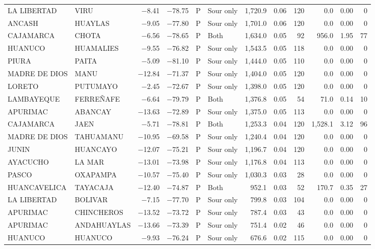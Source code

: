 \begin{landscape}
\begin{longtable}{llrrclrrrrrr}
LA LIBERTAD & VIRU & $-$8.41 & $-$78.75 & P & Sour only & 1,720.9 & 0.06 & 120 & 0.0 & 0.00 & 0 \\
ANCASH & HUAYLAS & $-$9.05 & $-$77.80 & P & Sour only & 1,701.0 & 0.06 & 120 & 0.0 & 0.00 & 0 \\
CAJAMARCA & CHOTA & $-$6.56 & $-$78.65 & P & Both & 1,634.0 & 0.05 & 92 & 956.0 & 1.95 & 77 \\
HUANUCO & HUAMALIES & $-$9.55 & $-$76.82 & P & Sour only & 1,543.5 & 0.05 & 118 & 0.0 & 0.00 & 0 \\
PIURA & PAITA & $-$5.09 & $-$81.10 & P & Sour only & 1,444.0 & 0.05 & 110 & 0.0 & 0.00 & 0 \\
MADRE DE DIOS & MANU & $-$12.84 & $-$71.37 & P & Sour only & 1,404.0 & 0.05 & 120 & 0.0 & 0.00 & 0 \\
LORETO & PUTUMAYO & $-$2.45 & $-$72.67 & P & Sour only & 1,398.0 & 0.05 & 120 & 0.0 & 0.00 & 0 \\
LAMBAYEQUE & FERREÑAFE & $-$6.64 & $-$79.79 & P & Both & 1,376.8 & 0.05 & 54 & 71.0 & 0.14 & 10 \\
APURIMAC & ABANCAY & $-$13.63 & $-$72.89 & P & Sour only & 1,375.0 & 0.05 & 113 & 0.0 & 0.00 & 0 \\
CAJAMARCA & JAEN & $-$5.71 & $-$78.81 & P & Both & 1,253.3 & 0.04 & 120 & 1,528.1 & 3.12 & 96 \\
MADRE DE DIOS & TAHUAMANU & $-$10.95 & $-$69.58 & P & Sour only & 1,240.4 & 0.04 & 120 & 0.0 & 0.00 & 0 \\
JUNIN & HUANCAYO & $-$12.07 & $-$75.21 & P & Sour only & 1,196.7 & 0.04 & 120 & 0.0 & 0.00 & 0 \\
AYACUCHO & LA MAR & $-$13.01 & $-$73.98 & P & Sour only & 1,176.8 & 0.04 & 113 & 0.0 & 0.00 & 0 \\
PASCO & OXAPAMPA & $-$10.57 & $-$75.40 & P & Sour only & 1,030.3 & 0.03 & 28 & 0.0 & 0.00 & 0 \\
HUANCAVELICA & TAYACAJA & $-$12.40 & $-$74.87 & P & Both & 952.1 & 0.03 & 52 & 170.7 & 0.35 & 27 \\
LA LIBERTAD & BOLIVAR & $-$7.15 & $-$77.70 & P & Sour only & 799.8 & 0.03 & 104 & 0.0 & 0.00 & 0 \\
APURIMAC & CHINCHEROS & $-$13.52 & $-$73.72 & P & Sour only & 787.4 & 0.03 & 43 & 0.0 & 0.00 & 0 \\
APURIMAC & ANDAHUAYLAS & $-$13.66 & $-$73.39 & P & Sour only & 751.4 & 0.02 & 46 & 0.0 & 0.00 & 0 \\
HUANUCO & HUANUCO & $-$9.93 & $-$76.24 & P & Sour only & 676.6 & 0.02 & 115 & 0.0 & 0.00 & 0 \\

\end{longtable}
\end{landscape}
